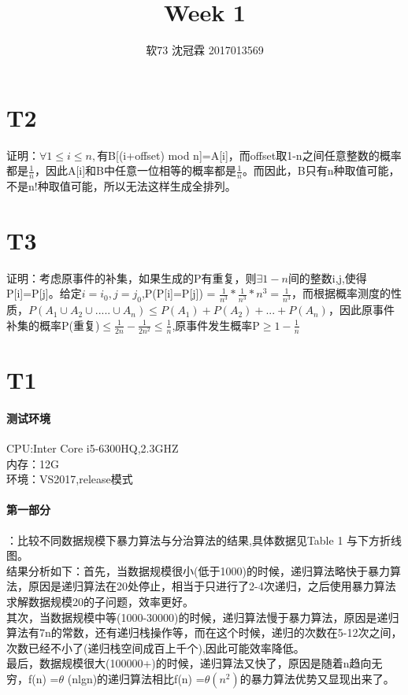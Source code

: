 \documentclass{article}
\title{Week 1}
\author{软73 沈冠霖 2017013569}
\begin{document}
\begin{CJK}{UTF8}{gkai}
\maketitle

\section{T2} 
证明：$\forall  1 \leq i \leq n,$有B[(i+offset) mod n]=A[i]，而offset取1-n之间任意整数的概率都是$\frac{1}{n}$，因此A[i]和B中任意一位相等的概率都是$\frac{1}{n}$。而因此，B只有n种取值可能，不是n!种取值可能，所以无法这样生成全排列。
\section{T3} 
证明：考虑原事件的补集，如果生成的P有重复，则$\exists 1-n$间的整数i,j,使得P[i]=P[j]。给定$i=i_{0},j=j_{0}$,P(P[i]=P[j]) = $\frac{1}{n^{3}}*\frac{1}{n^{3}}*n^{3} = \frac{1}{n^3}$，而根据概率测度的性质，$P(A_{1} \cup A_{2} \cup .....\cup A_{n}) \leq P(A_{1})+P(A_{2})+...+P(A_{n})$，因此原事件补集的概率P(重复)$\leq \frac{1}{2n}-\frac{1}{2n^{2}} \leq \frac{1}{n}$,原事件发生概率P$\geq 1-\frac{1}{n}$

\section{T1} 
\paragraph{测试环境}
CPU:Inter Core i5-6300HQ,2.3GHZ\\
内存：12G\\
环境：VS2017,release模式
\paragraph{第一部分}：比较不同数据规模下暴力算法与分治算法的结果,具体数据见Table 1 与下方折线图。\\
结果分析如下：首先，当数据规模很小(低于1000)的时候，递归算法略快于暴力算法，原因是递归算法在20处停止，相当于只进行了2-4次递归，之后使用暴力算法求解数据规模20的子问题，效率更好。\\
其次，当数据规模中等(1000-30000)的时候，递归算法慢于暴力算法，原因是递归算法有7n的常数，还有递归栈操作等，而在这个时候，递归的次数在5-12次之间，次数已经不小了(递归栈空间成百上千个),因此可能效率降低。\\
最后，数据规模很大(100000+)的时候，递归算法又快了，原因是随着n趋向无穷，f(n) =$\theta$ (nlgn)的递归算法相比f(n) =$\theta (n^{2})$的暴力算法优势又显现出来了。\\
\\
\\
\\


\end{CJK}
\end{document}
